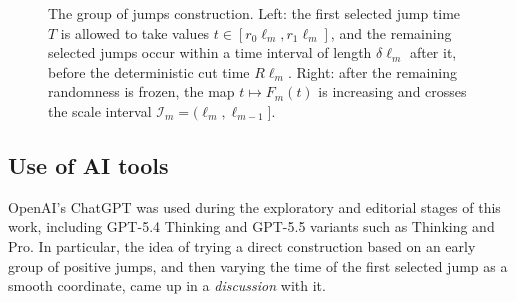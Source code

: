 \documentclass[10pt,a4paper]{amsart}
\newcommand{\1}{\mathbf 1}
\begin{document}
\begin{figure}[H]
\begin{minipage}[t]{0.47\textwidth}
\vspace{1mm}
\centering
{}
\end{minipage}

\caption{The group of jumps construction. Left: the first selected jump time $T$ is allowed to take values $t\in[r_0\ell_m,r_1\ell_m]$, and the remaining selected jumps occur within a time interval of length $\delta\ell_m$ after it, before the deterministic cut time $R\ell_m$. Right: after the remaining randomness is frozen, the map $t\mapsto F_m(t)$ is increasing and crosses the scale interval $\mathcal I_m=(\ell_m,\ell_{m-1}]$.}
\label{fig:group}
\end{figure}


\subsection{Use of AI tools}

OpenAI's ChatGPT was used during the exploratory and editorial stages of this work, including GPT-5.4 Thinking and GPT-5.5 variants such as Thinking and Pro. In particular, the idea of trying a direct construction based on an early group of positive jumps, and then varying the time of the first selected jump as a smooth coordinate, came up in a \textit{discussion} with it. 
\end{document}
